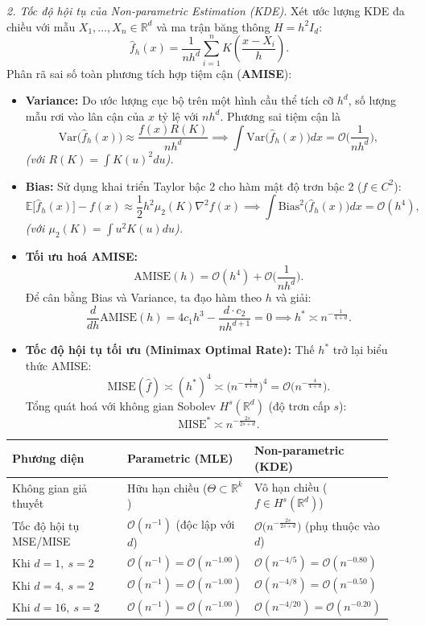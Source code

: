 \textit{2. Tốc độ hội tụ của Non-parametric Estimation (KDE).} Xét ước lượng KDE đa chiều với mẫu $X_1,\dots,X_n\in\mathbb{R}^{d}$ và ma trận băng thông $H=h^{2}I_d$:
\[ \widehat f_h(x)=\frac{1}{nh^{d}}\sum_{i=1}^{n}K\!\left(\frac{x-X_i}{h}\right). \]
Phân rã sai số toàn phương tích hợp tiệm cận (\textbf{AMISE}):
\begin{itemize}
\item \textbf{Variance:} Do ước lượng cục bộ trên một hình cầu thể tích cỡ $h^{d}$, số lượng mẫu rơi vào lân cận của $x$ tỷ lệ với $nh^{d}$. Phương sai tiệm cận là
\[ \mathrm{Var}\big(\widehat f_h(x)\big)\approx\frac{f(x)R(K)}{nh^{d}} \implies \int \mathrm{Var}\big(\widehat f_h(x)\big)dx=\mathcal{O}\Big(\frac{1}{nh^{d}}\Big), \]
\emph{(với $R(K)=\int K(u)^2du$).}
\item \textbf{Bias:} Sử dụng khai triển Taylor bậc 2 cho hàm mật độ trơn bậc 2 ($f\in C^{2}$):
\[ \mathbb{E}\big[\widehat f_h(x)\big]-f(x)\approx\frac12 h^{2}\mu_2(K)\nabla^{2}f(x) \implies \int \mathrm{Bias}^{2}\big(\widehat f_h(x)\big)dx=\mathcal{O}(h^{4}), \]
\emph{(với $\mu_2(K)=\int u^{2}K(u)du$).}
\item \textbf{Tối ưu hoá AMISE:}
\[ \mathrm{AMISE}(h)=\mathcal{O}(h^{4})+\mathcal{O}\Big(\frac{1}{nh^{d}}\Big). \]
Để cân bằng Bias và Variance, ta đạo hàm theo $h$ và giải:
\[ \frac{d}{dh}\mathrm{AMISE}(h)=4c_1h^{3}-\frac{d\cdot c_2}{nh^{d+1}}=0 \implies h^{*}\asymp n^{-\frac{1}{4+d}}. \]
\item \textbf{Tốc độ hội tụ tối ưu (Minimax Optimal Rate):} Thế $h^{*}$ trở lại biểu thức AMISE:
\[ \mathrm{MISE}(\widehat f)\asymp (h^{*})^{4}\asymp\Big(n^{-\frac{1}{4+d}}\Big)^{4}=\mathcal{O}\Big(n^{-\frac{4}{4+d}}\Big). \]
Tổng quát hoá với không gian Sobolev $H^{s}(\mathbb{R}^{d})$ (độ trơn cấp $s$):
\[ \mathrm{MISE}^{*}\asymp n^{-\frac{2s}{2s+d}}. \]
\end{itemize}

\begin{center}
\begin{tabular}{@{}p{0.30\linewidth}p{0.30\linewidth}p{0.34\linewidth}@{}}
\toprule
\textbf{Phương diện} & \textbf{Parametric (MLE)} & \textbf{Non-parametric (KDE)}\\
\midrule
Không gian giả thuyết & Hữu hạn chiều ($\Theta\subset\mathbb{R}^{k}$) & Vô hạn chiều ($f\in H^{s}(\mathbb{R}^{d})$)\\
Tốc độ hội tụ MSE/MISE & $\mathcal{O}(n^{-1})$ (độc lập với $d$) & $\mathcal{O}\big(n^{-\frac{2s}{2s+d}}\big)$ (phụ thuộc vào $d$)\\
Khi $d=1,\ s=2$ & $\mathcal{O}(n^{-1})=\mathcal{O}(n^{-1.00})$ & $\mathcal{O}(n^{-4/5})=\mathcal{O}(n^{-0.80})$\\
Khi $d=4,\ s=2$ & $\mathcal{O}(n^{-1})=\mathcal{O}(n^{-1.00})$ & $\mathcal{O}(n^{-4/8})=\mathcal{O}(n^{-0.50})$\\
Khi $d=16,\ s=2$ & $\mathcal{O}(n^{-1})=\mathcal{O}(n^{-1.00})$ & $\mathcal{O}(n^{-4/20})=\mathcal{O}(n^{-0.20})$\\
\bottomrule
\end{tabular}
\end{center}

